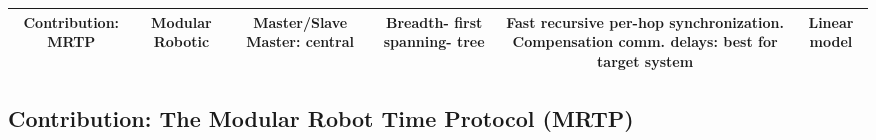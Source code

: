 {\begin{frame}
\begin{center}
	\begin{tabular}{|C{\lenFour}|C{\lenZero}|C{\lenTwo}|C{\lenMinusOne}|C{\lenThree}|C{\lenOne}|}
	\hline
	Contribution: MRTP  & \textcolor{\remarkColor}{Modular Robotic} & Master/Slave  \textcolor{\remarkColor}{Master: central} & \textcolor{\remarkColor}{Breadth- first} spanning- tree &  Fast recursive per-hop synchronization. \textcolor{\remarkColor}{Compensation comm. delays: best for target system} & Linear model\\
	\hline
	\end{tabular}
\end{center}
\end{frame}
}

\subsection{Contribution: The Modular Robot Time Protocol (MRTP)}

\subsectionOutlineFrame

